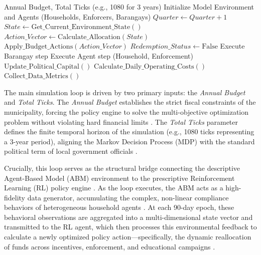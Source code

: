 \begin{algorithm}
\caption{Main Simulation Loop}
\label{alg:main_loop}
\begin{algorithmic}[1]
\renewcommand{\algorithmicrequire}{\textbf{Input:}}
\Require Annual Budget, Total Ticks (e.g., 1080 for 3 years)
\State Initialize Model Environment and Agents (Households, Enforcers, Barangays)
\Statex
{}
        \State {}
        \State $Quarter \gets Quarter + 1$
        \Statex
        \State {}
        \State $State \gets \text{Get\_Current\_Environment\_State}()$
        \State $Action\_Vector \gets \text{Calculate\_Allocation}(State)$
        \State $\text{Apply\_Budget\_Actions}(Action\_Vector)$
        \Statex
        \State {}
            \State $Redemption\_Status \gets \text{False}$
        \EndFor
    \EndIf
    \Statex
    \State {}
        \State Execute Barangay step
    \EndFor
        \State Execute Agent step (Household, Enforcement)
    \EndFor
    \Statex
    \State {}
    \State $\text{Update\_Political\_Capital}()$
    \State $\text{Calculate\_Daily\_Operating\_Costs}()$
    \State $\text{Collect\_Data\_Metrics}()$
\EndFor
\end{algorithmic}
\end{algorithm}

The main simulation loop is driven by two primary inputs: the \textit{Annual Budget} and \textit{Total Ticks}. The \textit{Annual Budget} establishes the strict fiscal constraints of the municipality, forcing the policy engine to solve the multi-objective optimization problem without violating hard financial limits \citep{Abdallah2021}. The \textit{Total Ticks} parameter defines the finite temporal horizon of the simulation (e.g., 1080 ticks representing a 3-year period), aligning the Markov Decision Process (MDP) with the standard political term of local government officials \citep{Akbarpour2021}.

Crucially, this loop serves as the structural bridge connecting the descriptive Agent-Based Model (ABM) environment to the prescriptive Reinforcement Learning (RL) policy engine \citep{Kompella2020}. As the loop executes, the ABM acts as a high-fidelity data generator, accumulating the complex, non-linear compliance behaviors of heterogeneous household agents \citep{Tian2024}. At each 90-day epoch, these behavioral observations are aggregated into a multi-dimensional state vector and transmitted to the RL agent, which then processes this environmental feedback to calculate a newly optimized policy action—specifically, the dynamic reallocation of funds across incentives, enforcement, and educational campaigns \citep{Ha2025}.


